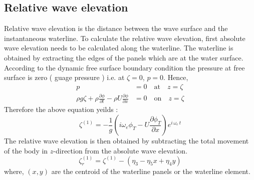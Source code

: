 \subsection{Relative wave elevation}
Relative wave elevation is the distance between the wave surface and the instantaneous waterline. To calculate the
relative wave elevation, first absolute wave elevation needs to be calculated along the waterline. The waterline is obtained 
by extracting the edges of the panels which are at the water surface. According to the dynamic free surface boundary 
condition the pressure at free surface is zero ( guage pressure ) i.e. at $\zeta=0$, $p=0$. Hence, 
\begin{align}
    p &= 0 \quad \text{at} \quad z=\zeta \\ \nonumber
    \rho g \zeta + \rho\frac{\partial \phi}{\partial t} - \rho U \frac{\partial \phi}{\partial x} &=0 \quad \text{on} \quad z=\zeta 
\end{align}
Therefore the above equation yeilds :
\begin{equation}
    \zeta^{(1)} = -\frac{1}{g}\left(i\omega_e \phi_T - U\frac{\partial \phi_T}{\partial x}\right) e^{i\,\omega_e\,t}
\end{equation}
The relative wave elevation is  then obtained by subtracting the total movement of the body in $z$-direction from the
absolute wave elevation.
\begin{equation}
    \zeta^{(1)}_r =\zeta^{(1)} - (\eta_3 - \eta_5x + \eta_4y)
\end{equation}
where, $(x, y)$ are the centroid of the waterline panels or the waterline element.

